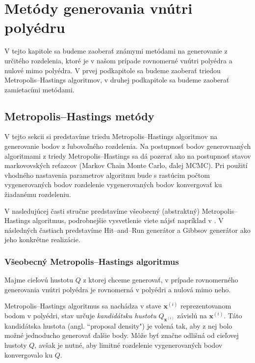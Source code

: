 \chapter{Metódy generovania vnútri polyédru}

V tejto kapitole sa budeme zaoberať známymi metódami na generovanie z určitého rozdelenia, ktoré je v našom prípade rovnomerné vnútri polyédra a nulové mimo polyédra. V prvej podkapitole sa budeme zaoberať triedou Metropolis--Hastings algoritmov, v druhej podkapitole sa budeme zaoberať zamietacími metódami.

\section{Metropolis--Hastings metódy}

V tejto sekcii si predstavíme triedu Metropolis--Hastings algoritmov na generovanie bodov z ľubovoľného rozdelenia. Na postupnosť bodov generovnaných algoritmami z triedy Metropolis--Hastings sa dá pozerať ako na postupnosť stavov markovovských reťazcov (Markov Chain Monte Carlo, ďalej MCMC). Pri použití vhodného nastavenia parametrov algoritmu bude s rastúcim počtom vygenerovaných bodov rozdelenie vygenerovaných bodov konvergovať ku žiadanému rozdeleniu.

V nasledujúcej časti stručne predstavíme všeobecný (abstraktný) Metropolis--Hastings algoritmus, podrobnejšie vysvetlenie viete nájsť napríklad v \cite{metropolis-hastings_chib}. V následných častiach predstavíme Hit--and--Run generátor a Gibbsov generátor ako jeho konkrétne realizácie.

\subsection{Všeobecný Metropolis--Hastings algoritmus}

Majme cieľovú hustotu $Q$ z ktorej chceme generovať, v prípade rovnomerného generovania vnútri polyédra je rovnomerná v polyédri a nulová mimo neho.

Metropolis--Hastings algoritmus \cite{metropolis-hastings_chib} sa nachádza v stave $\mathbf x^{(i)}$ reprezentovanom bodom v polyédri, stav určuje \textit{kandidátsku hustotu} $Q_{\mathbf x^{(i)}}$ závislú na $\mathbf x^{(i)}$. Táto kandidátska hustota (angl. ``proposal density") je volená tak, aby z nej bolo možné jednoducho generovať ďalšie body. Môže byť značne odlišná od cieľovej hustoty $Q$, avšak je nutné, aby limitné rozdelenie vygenerovaných bodov konvergovalo ku $Q$.

